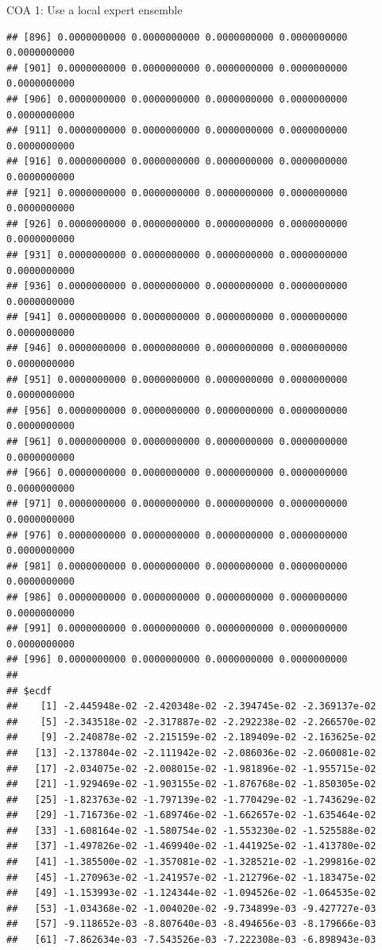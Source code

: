 \documentclass[ignorenonframetext,]{beamer}
\begin{document}
\begin{frame}[fragile]{COA 1: Use a local expert ensemble}
\begin{verbatim}
## [896] 0.0000000000 0.0000000000 0.0000000000 0.0000000000 0.0000000000
## [901] 0.0000000000 0.0000000000 0.0000000000 0.0000000000 0.0000000000
## [906] 0.0000000000 0.0000000000 0.0000000000 0.0000000000 0.0000000000
## [911] 0.0000000000 0.0000000000 0.0000000000 0.0000000000 0.0000000000
## [916] 0.0000000000 0.0000000000 0.0000000000 0.0000000000 0.0000000000
## [921] 0.0000000000 0.0000000000 0.0000000000 0.0000000000 0.0000000000
## [926] 0.0000000000 0.0000000000 0.0000000000 0.0000000000 0.0000000000
## [931] 0.0000000000 0.0000000000 0.0000000000 0.0000000000 0.0000000000
## [936] 0.0000000000 0.0000000000 0.0000000000 0.0000000000 0.0000000000
## [941] 0.0000000000 0.0000000000 0.0000000000 0.0000000000 0.0000000000
## [946] 0.0000000000 0.0000000000 0.0000000000 0.0000000000 0.0000000000
## [951] 0.0000000000 0.0000000000 0.0000000000 0.0000000000 0.0000000000
## [956] 0.0000000000 0.0000000000 0.0000000000 0.0000000000 0.0000000000
## [961] 0.0000000000 0.0000000000 0.0000000000 0.0000000000 0.0000000000
## [966] 0.0000000000 0.0000000000 0.0000000000 0.0000000000 0.0000000000
## [971] 0.0000000000 0.0000000000 0.0000000000 0.0000000000 0.0000000000
## [976] 0.0000000000 0.0000000000 0.0000000000 0.0000000000 0.0000000000
## [981] 0.0000000000 0.0000000000 0.0000000000 0.0000000000 0.0000000000
## [986] 0.0000000000 0.0000000000 0.0000000000 0.0000000000 0.0000000000
## [991] 0.0000000000 0.0000000000 0.0000000000 0.0000000000 0.0000000000
## [996] 0.0000000000 0.0000000000 0.0000000000 0.0000000000
## 
## $ecdf
##    [1] -2.445948e-02 -2.420348e-02 -2.394745e-02 -2.369137e-02
##    [5] -2.343518e-02 -2.317887e-02 -2.292238e-02 -2.266570e-02
##    [9] -2.240878e-02 -2.215159e-02 -2.189409e-02 -2.163625e-02
##   [13] -2.137804e-02 -2.111942e-02 -2.086036e-02 -2.060081e-02
##   [17] -2.034075e-02 -2.008015e-02 -1.981896e-02 -1.955715e-02
##   [21] -1.929469e-02 -1.903155e-02 -1.876768e-02 -1.850305e-02
##   [25] -1.823763e-02 -1.797139e-02 -1.770429e-02 -1.743629e-02
##   [29] -1.716736e-02 -1.689746e-02 -1.662657e-02 -1.635464e-02
##   [33] -1.608164e-02 -1.580754e-02 -1.553230e-02 -1.525588e-02
##   [37] -1.497826e-02 -1.469940e-02 -1.441925e-02 -1.413780e-02
##   [41] -1.385500e-02 -1.357081e-02 -1.328521e-02 -1.299816e-02
##   [45] -1.270963e-02 -1.241957e-02 -1.212796e-02 -1.183475e-02
##   [49] -1.153993e-02 -1.124344e-02 -1.094526e-02 -1.064535e-02
##   [53] -1.034368e-02 -1.004020e-02 -9.734899e-03 -9.427727e-03
##   [57] -9.118652e-03 -8.807640e-03 -8.494656e-03 -8.179666e-03
##   [61] -7.862634e-03 -7.543526e-03 -7.222308e-03 -6.898943e-03

\end{verbatim}
\end{frame}
\end{document}
